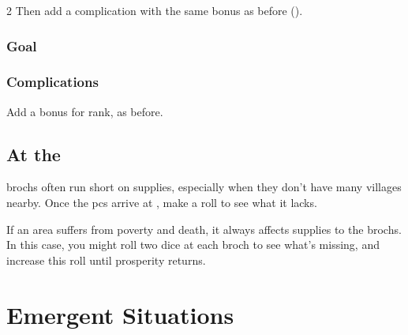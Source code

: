 \begin{multicols}{2}
Then add a complication with the same bonus as before ().

\subsubsection{Goal}

\null
\ngMissions

\subsubsection{Complications}

Add a bonus for rank, as before.

\missionComplications

\subsection{At the }

\Glspl{broch} often run short on supplies, especially when they don't have many \glspl{village} nearby.
Once the \glspl{pc} arrive at , make a roll to see what it lacks.

\brochDerths

If an area suffers from poverty and death, it always affects supplies to the \glspl{broch}.
In this case, you might roll two dice at each \gls{broch} to see what's missing, and increase this roll until prosperity returns.

\end{multicols}

\section{Emergent Situations}
\label{roadEncounters}

